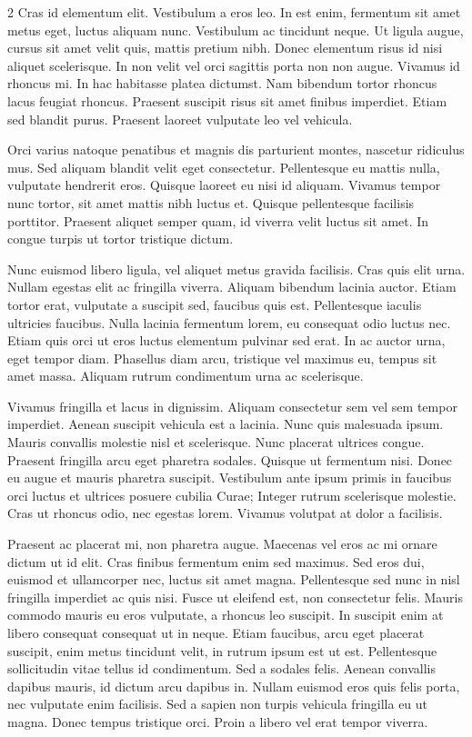 \documentclass[twoside]{article}
\begin{document}
\begin{multicols}{2}
Cras id elementum elit. Vestibulum a eros leo. In est enim, fermentum sit amet metus eget, luctus aliquam nunc. Vestibulum ac tincidunt neque. Ut ligula augue, cursus sit amet velit quis, mattis pretium nibh. Donec elementum risus id nisi aliquet scelerisque. In non velit vel orci sagittis porta non non augue. Vivamus id rhoncus mi. In hac habitasse platea dictumst. Nam bibendum tortor rhoncus lacus feugiat rhoncus. Praesent suscipit risus sit amet finibus imperdiet. Etiam sed blandit purus. Praesent laoreet vulputate leo vel vehicula.

Orci varius natoque penatibus et magnis dis parturient montes, nascetur ridiculus mus. Sed aliquam blandit velit eget consectetur. Pellentesque eu mattis nulla, vulputate hendrerit eros. Quisque laoreet eu nisi id aliquam. Vivamus tempor nunc tortor, sit amet mattis nibh luctus et. Quisque pellentesque facilisis porttitor. Praesent aliquet semper quam, id viverra velit luctus sit amet. In congue turpis ut tortor tristique dictum.

Nunc euismod libero ligula, vel aliquet metus gravida facilisis. Cras quis elit urna. Nullam egestas elit ac fringilla viverra. Aliquam bibendum lacinia auctor. Etiam tortor erat, vulputate a suscipit sed, faucibus quis est. Pellentesque iaculis ultricies faucibus. Nulla lacinia fermentum lorem, eu consequat odio luctus nec. Etiam quis orci ut eros luctus elementum pulvinar sed erat. In ac auctor urna, eget tempor diam. Phasellus diam arcu, tristique vel maximus eu, tempus sit amet massa. Aliquam rutrum condimentum urna ac scelerisque.



Vivamus fringilla et lacus in dignissim. Aliquam consectetur sem vel sem tempor imperdiet. Aenean suscipit vehicula est a lacinia. Nunc quis malesuada ipsum. Mauris convallis molestie nisl et scelerisque. Nunc placerat ultrices congue. Praesent fringilla arcu eget pharetra sodales. Quisque ut fermentum nisi. Donec eu augue et mauris pharetra suscipit. Vestibulum ante ipsum primis in faucibus orci luctus et ultrices posuere cubilia Curae; Integer rutrum scelerisque molestie. Cras ut rhoncus odio, nec egestas lorem. Vivamus volutpat at dolor a facilisis.

Praesent ac placerat mi, non pharetra augue. Maecenas vel eros ac mi ornare dictum ut id elit. Cras finibus fermentum enim sed maximus. Sed eros dui, euismod et ullamcorper nec, luctus sit amet magna. Pellentesque sed nunc in nisl fringilla imperdiet ac quis nisi. Fusce ut eleifend est, non consectetur felis. Mauris commodo mauris eu eros vulputate, a rhoncus leo suscipit. In suscipit enim at libero consequat consequat ut in neque. Etiam faucibus, arcu eget placerat suscipit, enim metus tincidunt velit, in rutrum ipsum est ut est. Pellentesque sollicitudin vitae tellus id condimentum. Sed a sodales felis. Aenean convallis dapibus mauris, id dictum arcu dapibus in. Nullam euismod eros quis felis porta, nec vulputate enim facilisis. Sed a sapien non turpis vehicula fringilla eu ut magna. Donec tempus tristique orci. Proin a libero vel erat tempor viverra.


\end{multicols}
\end{document}
